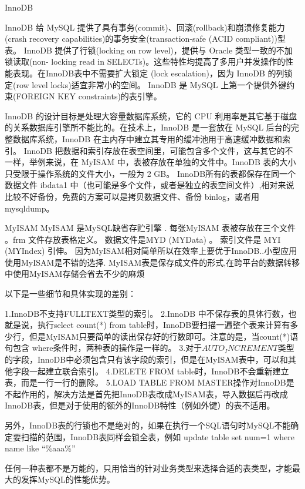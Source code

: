 \documentclass[UTF8]{ctexart}
\begin{document}
InnoDB

InnoDB 给 MySQL 提供了具有事务(commit)、回滚(rollback)和崩溃修复能力 (crash recovery capabilities)的事务安全(transaction-safe (ACID compliant))型表。 InnoDB 提供了行锁(locking on row level)，提供与 Oracle 类型一致的不加锁读取(non- locking read in SELECTs)。这些特性均提高了多用户并发操作的性能表现。在InnoDB表中不需要扩大锁定 (lock escalation)，因为 InnoDB 的列锁定(row level locks)适宜非常小的空间。 InnoDB 是 MySQL 上第一个提供外键约束(FOREIGN KEY constraints)的表引擎。  

InnoDB 的设计目标是处理大容量数据库系统，它的 CPU 利用率是其它基于磁盘的关系数据库引擎所不能比的。在技术上，InnoDB 是一套放在 MySQL 后台的完整数据库系统，InnoDB 在主内存中建立其专用的缓冲池用于高速缓冲数据和索引。 InnoDB 把数据和索引存放在表空间里，可能包含多个文件，这与其它的不一样，举例来说，在 MyISAM 中，表被存放在单独的文件中。InnoDB 表的大小只受限于操作系统的文件大小，一般为 2 GB。  
InnoDB所有的表都保存在同一个数据文件 ibdata1 中（也可能是多个文件，或者是独立的表空间文件）,相对来说比较不好备份，免费的方案可以是拷贝数据文件、备份 binlog，或者用 mysqldump。  

MyISAM   
MyISAM 是MySQL缺省存贮引擎 .   
每张MyISAM 表被存放在三个文件 。frm 文件存放表格定义。 数据文件是MYD (MYData) 。 索引文件是 MYI (MYIndex) 引伸。   
因为MyISAM相对简单所以在效率上要优于InnoDB..小型应用使用MyISAM是不错的选择.   
MyISAM表是保存成文件的形式,在跨平台的数据转移中使用MyISAM存储会省去不少的麻烦   
  
以下是一些细节和具体实现的差别：   
  
1.InnoDB不支持FULLTEXT类型的索引。   
2.InnoDB 中不保存表的具体行数，也就是说，执行select count(*) from table时，InnoDB要扫描一遍整个表来计算有多少行，但是MyISAM只要简单的读出保存好的行数即可。注意的是，当count(*)语句包含 where条件时，两种表的操作是一样的。  
3.对于$AUTO_INCREMENT$类型的字段，InnoDB中必须包含只有该字段的索引，但是在MyISAM表中，可以和其他字段一起建立联合索引。   
4.DELETE FROM table时，InnoDB不会重新建立表，而是一行一行的删除。   
5.LOAD TABLE FROM MASTER操作对InnoDB是不起作用的，解决方法是首先把InnoDB表改成MyISAM表，导入数据后再改成InnoDB表，但是对于使用的额外的InnoDB特性（例如外键）的表不适用。  

另外，InnoDB表的行锁也不是绝对的，如果在执行一个SQL语句时MySQL不能确定要扫描的范围，InnoDB表同样会锁全表，例如 update table set num=1 where name like “\%aaa\%”  

任何一种表都不是万能的，只用恰当的针对业务类型来选择合适的表类型，才能最大的发挥MySQL的性能优势。   
\end{document}
